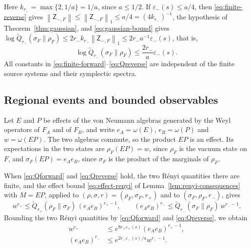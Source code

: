 \documentclass[11pt]{amsart}
\numberwithin{equation}{section}
\theoremstyle{definition}
\newcommand{\Qtil}{\widetilde Q}
\newcommand{\norm}[1]{\left\|#1\right\|}
\begin{document}
Here \(k_{r_-}=\max\{2,1/a\}=1/a\), since \(a\le1/2\). If
\(\varepsilon_-(s)\le a/4\), then \eqref{eq:finite-reverse} gives
\(\norm{\mathsf Z_{-,F}}\le\norm{\mathsf Z_{-,F}}_1\le a/4=(4k_{r_-})^{-1}\),
the hypothesis of Theorem~\ref{thm:gaussian}, and
\eqref{eq:gaussian-bound} gives
\(\log\Qtil_{r_-}(\sigma_F\|\rho_F)\le2r_-k_{r_-}\norm{\mathsf Z_{-,F}}_1
\le2r_-a^{-1}\varepsilon_-(s)\), that is,
\begin{equation}
 \log\Qtil_{r_-}(\sigma_F\|\rho_F)
 \le\frac{2r_-}{a}\varepsilon_-(s).
 \label{eq:Qreverse}
\end{equation}
All constants in \eqref{eq:finite-forward}--\eqref{eq:Qreverse}
are independent of the finite source systems and their symplectic
spectra.

\subsection{Regional events and bounded observables}

Let \(E\) and \(P\) be effects of the von Neumann algebras generated by
the Weyl operators of \(F_A\) and of \(F_B\), and write
\(e_A=\omega(E)\), \(e_B=\omega(P)\) and \(w=\omega(EP)\). The two
algebras commute, so the product
\(EP\) is an effect. Its expectations in the two states are
\(\rho_F(EP)=w\), since \(\rho_F\) is the vacuum state on \(F\), and
\(\sigma_F(EP)=e_Ae_B\), since \(\sigma_F\) is the product of the
marginals of \(\rho_F\).

When \eqref{eq:Qforward} and \eqref{eq:Qreverse} hold, the two Rényi
quantities there are finite, and the effect bound
\eqref{eq:effect-renyi} of Lemma~\ref{lem:renyi-consequences} with
\(M=EP\), applied to \((\rho,\sigma,r)=(\rho_F,\sigma_F,r_+)\) and to
\((\sigma_F,\rho_F,r_-)\), gives
\[
 w^{r_+}\le\Qtil_{r_+}(\rho_F\|\sigma_F)\,(e_Ae_B)^{r_+-1},
 \qquad
 (e_Ae_B)^{r_-}\le\Qtil_{r_-}(\sigma_F\|\rho_F)\,w^{r_--1}.
\]
Bounding the two Rényi quantities by \eqref{eq:Qforward} and
\eqref{eq:Qreverse}, we obtain
\begin{align}
 w^{r_+}
 &\le e^{8r_+\varepsilon_+(s)}(e_Ae_B)^{r_+-1},
 \label{eq:forward-events}\\
 (e_Ae_B)^{r_-}
 &\le e^{2r_-\varepsilon_-(s)/a}w^{r_--1}.
 \label{eq:reverse-events}
\end{align}
\end{document}
